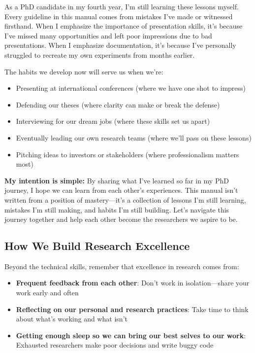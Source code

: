 \documentclass[11pt,a4paper]{article}
\begin{document}
As a PhD candidate in my fourth year, I'm still learning these lessons myself. Every guideline in this manual comes from mistakes I've made or witnessed firsthand. When I emphasize the importance of presentation skills, it's because I've missed many opportunities and left poor impressions due to bad presentations. When I emphasize documentation, it's because I've personally struggled to recreate my own experiments from months earlier.

The habits we develop now will serve us when we're:
\begin{itemize}
    \item Presenting at international conferences (where we have one shot to impress)
    \item Defending our theses (where clarity can make or break the defense)
    \item Interviewing for our dream jobs (where these skills set us apart)
    \item Eventually leading our own research teams (where we'll pass on these lessons)
    \item Pitching ideas to investors or stakeholders (where professionalism matters most)
\end{itemize}

\textbf{My intention is simple:} By sharing what I've learned so far in my PhD journey, I hope we can learn from each other's experiences. This manual isn't written from a position of mastery—it's a collection of lessons I'm still learning, mistakes I'm still making, and habits I'm still building. Let's navigate this journey together and help each other become the researchers we aspire to be.

\subsection{How We Build Research Excellence}

Beyond the technical skills, remember that excellence in research comes from:
\begin{itemize}
    \item \textbf{Frequent feedback from each other}: Don't work in isolation—share your work early and often
    \item \textbf{Reflecting on our personal and research practices}: Take time to think about what's working and what isn't
    \item \colorbox{yellow!30}{\textbf{Getting enough sleep so we can bring our best selves to our work}:} \newline \colorbox{yellow!30}{Exhausted researchers make poor decisions and write buggy code}
\end{itemize}
\end{document}
